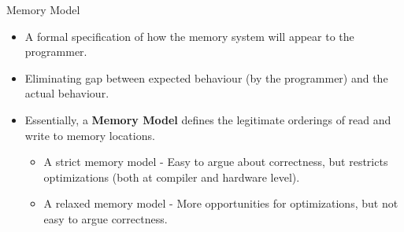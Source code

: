 \documentclass[9pt]{beamer}
\begin{document}
\begin{frame}{Memory Model}
\begin{itemize}
\item A formal specification of how the memory system will appear to the programmer.
\item Eliminating gap between expected behaviour (by the programmer) and the
      actual behaviour.
\item Essentially, a \textbf{Memory Model} defines the legitimate orderings of read and write
      to memory locations.
\pause
  \begin{itemize}
  \item A strict memory model - Easy to argue about correctness, but restricts
        optimizations (both at compiler and hardware level).
  \item A relaxed memory model - More opportunities for optimizations, but not
        easy to argue correctness.
  \end{itemize}
\pause
  
\end{itemize}
\end{frame}
\end{document}
